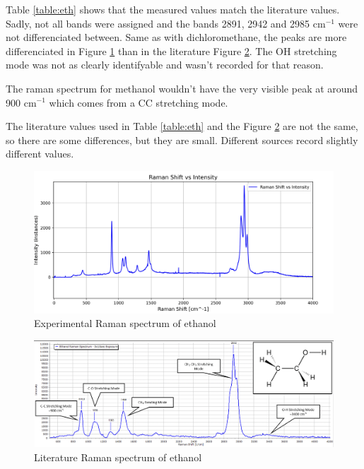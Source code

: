     Table \ref{table:eth} shows that the measured values match the literature values. Sadly, not all bands were assigned and the bands 2891, 2942 and 2985 cm\(^{-1}\) were not differenciated between. Same as with dichloromethane, the peaks are more differenciated in Figure \ref{fig:eth_x} than in the literature Figure \ref{fig:eth_l}. The OH stretching mode was not as clearly identifyable and wasn't recorded for that reason.

    \bigskip
    
    The raman spectrum for methanol wouldn't have the very visible peak at around 900 cm\(^{-1}\) which comes from a CC stretching mode.

    The literature values used in Table \ref{table:eth} and the Figure \ref{fig:eth_l} are not the same, so there are some differences, but they are small. Different sources record slightly different values. 

    

    \newpage

    \begin{figure}[h]
        \includegraphics[width=\textwidth]{images/raman_spectra/raman_shift_ethanol.png}
        \caption{Experimental Raman spectrum of ethanol}
        \label{fig:eth_x}
        \vspace{30pt}
    \end{figure}


    \begin{figure}[h]
        \centering
        \includegraphics[width=\textwidth]{images/lit_raman/ethanol.png}
        \caption{Literature Raman spectrum of ethanol \cite{spectrumet} }
        \label{fig:eth_l}
    \end{figure}

